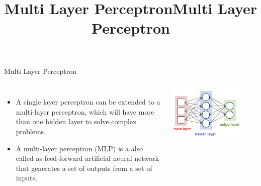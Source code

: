 \documentclass[aspectratio=169,13pt,usenames,dvipsnames]{beamer}
\title[Multi Layer Perceptron]{Multi Layer Perceptron}
\begin{document}
{\1
\begin{frame} \vspace{35pt}
	\title[Multi Layer Perceptron]{Multi Layer Perceptron}
	
	\maketitle
\end{frame}
}

\begin{frame}{Multi Layer Perceptron}
\begin{columns}

\begin{itemize}
  \item A single layer perceptron can be extended to a multi-layer perceptron, which will have more than one hidden layer to solve complex problems.
  \item A multi-layer perceptron (MLP) is a also called as feed-forward artificial neural network that generates a set of outputs from a set of inputs.
\end{itemize}
\includegraphics[width=0.8\textwidth, height=0.6\textheight]{Images/AIML_MLP_IMG1.jpg}
\end{columns}
\end{frame}
\end{document}
